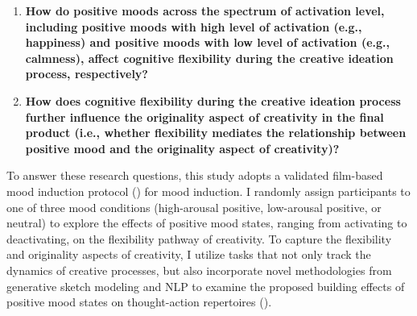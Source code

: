 \documentclass[../MA_Thesis.tex]{subfiles}
\begin{document}
\begin{enumerate}
    \item \textbf{How do positive moods across the spectrum of activation level, including positive moods with high level of activation (e.g., happiness) and positive moods with low level of activation (e.g., calmness), affect cognitive flexibility during the creative ideation process, respectively?}
    \item \textbf{How does cognitive flexibility during the creative ideation process further influence the originality aspect of creativity in the final product (i.e., whether flexibility mediates the relationship between positive mood and the originality aspect of creativity)?}
\end{enumerate}

To answer these research questions, this study adopts a validated film-based mood induction protocol (\cite{siedlecka_experimental_2019}) for mood induction. I randomly assign participants to one of three mood conditions (high-arousal positive, low-arousal positive, or neutral) to explore the effects of positive mood states, ranging from activating to deactivating, on the flexibility pathway of creativity. To capture the flexibility and originality aspects of creativity, I utilize tasks that not only track the dynamics of creative processes, but also incorporate novel methodologies from generative sketch modeling and NLP to examine the proposed building effects of positive mood states on thought-action repertoires (\cite{fredrickson_role_2001}). 
\end{document}
